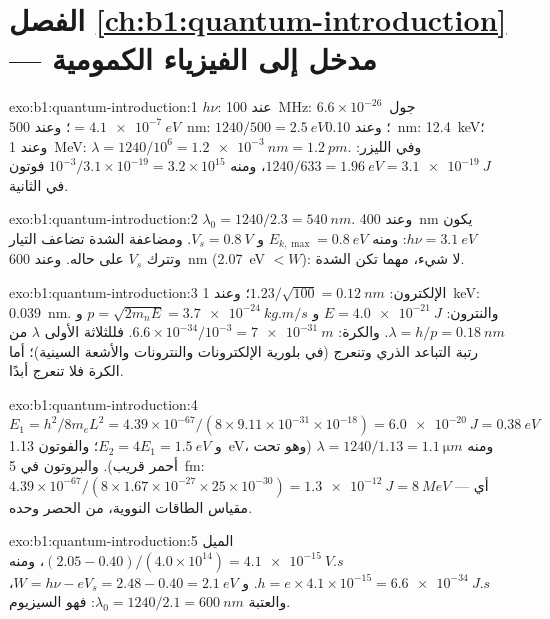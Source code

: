 \section*{الفصل \ref{ch:b1:quantum-introduction} --- مدخل إلى الفيزياء الكمومية}

\begin{solution}{exo:b1:quantum-introduction:1}
$h\nu$: عند \qty{100}{MHz}: $6.6 \times 10^{-26}$~جول $= \qty{4.1e-7}{eV}$؛ وعند \qty{500}{nm}:
$1240/500 = \qty{2.5}{eV}$؛ وعند \qty{0.10}{nm}: \qty{12.4}{keV}؛ وعند \qty{1}{MeV}: $\lambda =
1240/10^6 = \qty{1.2e-3}{nm} = \qty{1.2}{pm}$. وفي الليزر: $1240/633 = \qty{1.96}{eV} =
\qty{3.1e-19}{J}$، ومنه $10^{-3}/3.1 \times 10^{-19} = 3.2 \times 10^{15}$ فوتون في
الثانية.
\end{solution}

\begin{solution}{exo:b1:quantum-introduction:2}
$\lambda_0 = 1240/2.3 = \qty{540}{nm}$. وعند \qty{400}{nm} يكون $h\nu = \qty{3.1}{eV}$:
ومنه $E_{k,\max} = \qty{0.8}{eV}$ و $V_s = \qty{0.8}{V}$. ومضاعفة الشدة
تضاعف التيار وتترك $V_s$ على حاله. وعند \qty{600}{nm}
(\qty{2.07}{eV} $< W$): لا شيء، مهما تكن الشدة.
\end{solution}

\begin{solution}{exo:b1:quantum-introduction:3}
الإلكترون: $1.23/\sqrt{100} = \qty{0.12}{nm}$؛ وعند \qty{1}{keV}: \qty{0.039}{nm}.
والنترون: $E = \qty{4.0e-21}{J}$ و $p = \sqrt{2m_nE} = \qty{3.7e-24}{kg.m/s}$
و $\lambda = h/p = \qty{0.18}{nm}$. والكرة: $6.6 \times 10^{-34}/10^{-3} = \qty{7e-31}{m}$.
فللثلاثة الأولى $\lambda$ من رتبة التباعد الذري وتنعرج
(في بلورية الإلكترونات والنترونات والأشعة السينية)؛ أما الكرة فلا تنعرج أبدًا.
\end{solution}

\begin{solution}{exo:b1:quantum-introduction:4}
$E_1 = h^2/8m_eL^2 = 4.39 \times 10^{-67}/(8 \times 9.11 \times 10^{-31} \times 10^{-18}) =
\qty{6.0e-20}{J} = \qty{0.38}{eV}$ و $E_2 = 4E_1 = \qty{1.5}{eV}$؛ والفوتون
\qty{1.13}{eV}، ومنه $\lambda = 1240/1.13 = \qty{1.1}{\micro m}$ (وهو تحت أحمر قريب). والبروتون
في \qty{5}{fm}: $4.39 \times 10^{-67}/(8 \times 1.67 \times 10^{-27} \times 25 \times 10^{-30}) =
\qty{1.3e-12}{J} = \qty{8}{MeV}$ --- أي مقياس الطاقات النووية، من
الحصر وحده.
\end{solution}

\begin{solution}{exo:b1:quantum-introduction:5}
الميل $(2.05 - 0.40)/(4.0 \times 10^{14}) = \qty{4.1e-15}{V.s}$، ومنه $h = e \times 4.1 \times
10^{-15} = \qty{6.6e-34}{J.s}$. و $W = h\nu - eV_s = 2.48 - 0.40 = \qty{2.1}{eV}$،
والعتبة $\lambda_0 = 1240/2.1 = \qty{600}{nm}$: فهو السيزيوم.
\end{solution}

